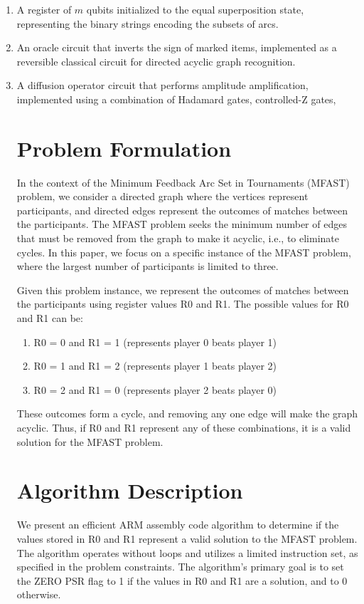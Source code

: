 \begin{enumerate}
    \item A register of $m$ qubits initialized to the equal superposition state, representing the binary strings encoding the subsets of arcs.
    \item An oracle circuit that inverts the sign of marked items, implemented as a reversible classical circuit for directed acyclic graph recognition.
    \item A diffusion operator circuit that performs amplitude amplification, implemented using a combination of Hadamard gates, controlled-Z gates,

\section{Problem Formulation}

In the context of the Minimum Feedback Arc Set in Tournaments (MFAST) problem, we consider a directed graph where the vertices represent participants, and directed edges represent the outcomes of matches between the participants. The MFAST problem seeks the minimum number of edges that must be removed from the graph to make it acyclic, i.e., to eliminate cycles. In this paper, we focus on a specific instance of the MFAST problem, where the largest number of participants is limited to three.

Given this problem instance, we represent the outcomes of matches between the participants using register values R0 and R1. The possible values for R0 and R1 can be:

\begin{enumerate}
    \item R0 = 0 and R1 = 1 (represents player 0 beats player 1)
    \item R0 = 1 and R1 = 2 (represents player 1 beats player 2)
    \item R0 = 2 and R1 = 0 (represents player 2 beats player 0)
\end{enumerate}

These outcomes form a cycle, and removing any one edge will make the graph acyclic. Thus, if R0 and R1 represent any of these combinations, it is a valid solution for the MFAST problem.

\section{Algorithm Description}

We present an efficient ARM assembly code algorithm to determine if the values stored in R0 and R1 represent a valid solution to the MFAST problem. The algorithm operates without loops and utilizes a limited instruction set, as specified in the problem constraints. The algorithm's primary goal is to set the ZERO PSR flag to 1 if the values in R0 and R1 are a solution, and to 0 otherwise.


\end{enumerate}
